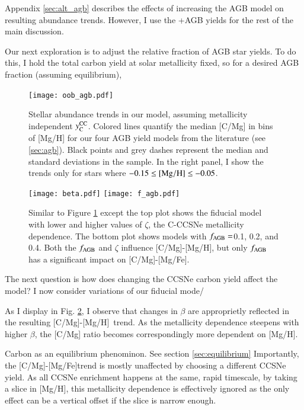 \documentclass[12pt,oneside]{report}
\newcommand{\cristallo}{\citetalias{cristallo+11}+\citetalias{cristallo+15}}
\newcommand{\caah}{[C/Mg]-[Mg/H]}
\newcommand{\caafe}{[C/Mg]-[Mg/Fe]}
\newcommand{\Ycc}{\ensuremath{y_{\rm C}^{\rm CC}}}
\begin{document}
Appendix \ref{sec:alt_agb} describes the effects of increasing the AGB model on
resulting abundance trends. However, I use the \cristallo AGB yields for the
rest of the main discussion.

Our next exploration is to adjust the relative fraction of AGB star yields. To do this, I hold the total carbon yield at solar metallicity fixed, so for a desired AGB fraction (assuming equilibrium), 


\begin{figure}
\centering
\texttt{[image: oob\_agb.pdf]}
\caption[AGB GCE Models]{
    Stellar abundance trends in our model, assuming metallicity independent $\Ycc$. Colored lines quantify the median [C/Mg] in bins of [Mg/H] for our four AGB yield models from the literature (see \ref{sec:agb}). Black points and grey dashes represent the median and standard deviations in the \citet{jack_subgiant} sample. In the right panel, I show the trends only for stars where $-0.15\leq {\rm [Mg/H]}\leq -0.05$.
}
\label{fig:agb_sims}
\end{figure}

\begin{figure}\label{fig:beta_f}
\centering
\texttt{[image: beta.pdf]}
\texttt{[image: f\_agb.pdf]}

\caption[Adjusted yield models]{Similar to Figure \ref{fig:agb_sims} except the top plot shows the fiducial model with lower and higher values of $\zeta$, the C-CCSNe metallicity dependence. The bottom plot shows models with $f_{\rm AGB}=$0.1, 0.2, and 0.4. Both the $f_{\rm AGB}$ and $\zeta$ influence \caah, but only $f_{\rm AGB}$ has a significant impact on \caafe.}
\end{figure}

The next question is how does changing the CCSNe carbon yield affect the model?
I now consider variations of our fiducial mode/


As I display in Fig. \ref{fig:beta_f}, I observe that changes in $\beta$ are
approprietly reflected in the resulting \caah~trend. As the metallicity
dependence steepens with higher $\beta$, the [C/Mg] ratio becomes
correspondingly more dependent on [Mg/H].

Carbon as an equilibrium phenominon. See section \ref{sec:equilibrium} Importantly, the \caafe trend is mostly unaffected by choosing a different
CCSNe yield. As all CCSNe enrichment happens at the same, rapid timescale, by
taking a slice in [Mg/H], this metallicity dependence is effectively ignored as
the only effect can be a vertical offset if the slice is narrow enough. 
\end{document}
